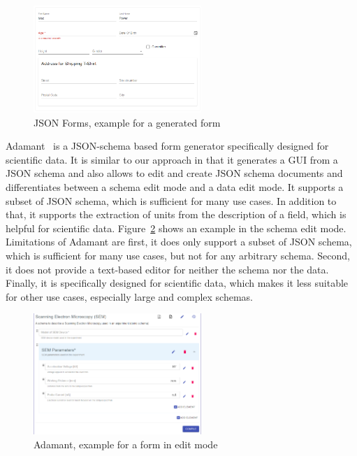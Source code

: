 \begin{figure}[htb]
    \centering
    \includegraphics[width=2.5in]{figures/jsonforms}
    \caption{JSON Forms, example for a generated form}
    \label{fig:jsonforms}
\end{figure}

Adamant~\cite{siffa2022adamant} is a JSON-schema based form generator specifically designed for scientific data.
It is similar to our approach in that it generates a GUI from a JSON schema and also allows to edit and create JSON schema documents
and differentiates between a schema edit mode and a data edit mode.
It supports a subset of JSON schema, which is sufficient for many use cases.
In addition to that, it supports the extraction of units from the description of a field, which is helpful for scientific data.
Figure~\ref{fig:adamant} shows an example in the schema edit mode.
Limitations of Adamant are first, it does only support a subset of JSON schema, which is sufficient for many use cases, but not for any arbitrary schema.
Second, it does not provide a text-based editor for neither the schema nor the data.
Finally, it is specifically designed for scientific data, which makes it less suitable for other use cases, especially large and complex schemas.

\begin{figure}[htb]
    \centering
    \includegraphics[width=2.5in]{figures/adamant}
    \caption{Adamant, example for a form in edit mode}
    \label{fig:adamant}
\end{figure}


